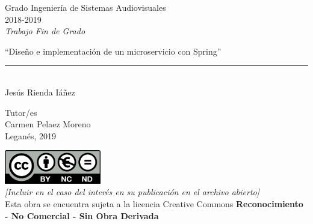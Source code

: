 \documentclass[12pt]{report} %
\begin{document}
	
\begin{titlepage}
	\begin{sffamily}
	\color{azulUC3M}
	\begin{center}
		\begin{figure}[H] %
		\end{figure}
		\vspace{2.5cm}
		\begin{Large}
			Grado Ingeniería de Sistemas Audiovisuales\\			
			2018-2019\\
			\vspace{2cm}		
			\textsl{Trabajo Fin de Grado}
			\bigskip
			
		\end{Large}
		 	{\Huge ``Diseño e implementación de un microservicio con Spring''}\\
		 	\vspace*{0.5cm}
	 		\rule{10.5cm}{0.1mm}\\
			\vspace*{0.9cm}
			{\LARGE Jesús Rienda Iáñez}\\ 
			\vspace*{1cm}
		\begin{Large}
			Tutor/es\\
			Carmen Pelaez Moreno\\
			Leganés, 2019\\
		\end{Large}
	\end{center}
	\vfill
	\color{black}
	\includegraphics[width=4.2cm]{imagenes/creativecommons.png}\\
	\emph{[Incluir en el caso del interés en su publicación en el archivo abierto]}\\
	Esta obra se encuentra sujeta a la licencia Creative Commons \textbf{Reconocimiento - No Comercial - Sin Obra Derivada}
	\end{sffamily}
\end{titlepage}
\end{document}
